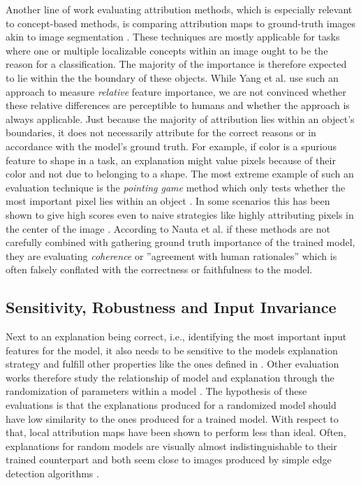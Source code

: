 Another line of work evaluating attribution methods, which is especially relevant to concept-based methods, is comparing attribution maps to ground-truth images akin to image segmentation \cite{Kim2018,Yang2019,Bau2020,Arras2022,Clark2023}. These techniques are mostly applicable for tasks where one or multiple localizable concepts within an image ought to be the reason for a classification. The majority of the importance is therefore expected to lie within the the boundary of these objects. While Yang et al. \cite{Yang2019} use such an approach to measure \textit{relative} feature importance, we are not convinced whether these relative differences are perceptible to humans and whether the approach is always applicable. Just because the majority of attribution lies within an object's boundaries, it does not necessarily attribute for the correct reasons or in accordance with the model's ground truth. For example, if color is a spurious feature to shape in a task, an explanation might value pixels because of their color and not due to belonging to a shape. The most extreme example of such an evaluation technique is the \textit{pointing game} method which only tests whether the most important pixel lies within an object \cite{Zhang2016}. In some scenarios this has been shown to give high scores even to naive strategies like highly attributing pixels in the center of the image \cite{Gu2019}. According to Nauta et al. \cite{Nauta2023} if these methods are not carefully combined with gathering ground truth importance of the trained model, they are evaluating \textit{coherence} or ''agreement with human rationales'' which is often falsely conflated with the correctness or faithfulness to the model. 

\subsection{Sensitivity, Robustness and Input Invariance}
Next to an explanation being correct, i.e., identifying the most important input features for the model, it also needs to be sensitive to the models explanation strategy and fulfill other properties like the ones defined in \cite{Nauta2023}.
Other evaluation works therefore study the relationship of model and explanation through the randomization of parameters within a model \cite{Adebayo2018, Sixt2020, MORE}. The hypothesis of these evaluations is that the explanations produced for a randomized model should have low similarity to the ones produced for a trained model. With respect to that, local attribution maps have been shown to perform less than ideal. Often, explanations for random models are visually almost indistinguishable to their trained counterpart and both seem close to images produced by simple edge detection algorithms \cite{Adebayo2018, Clark2023}.

